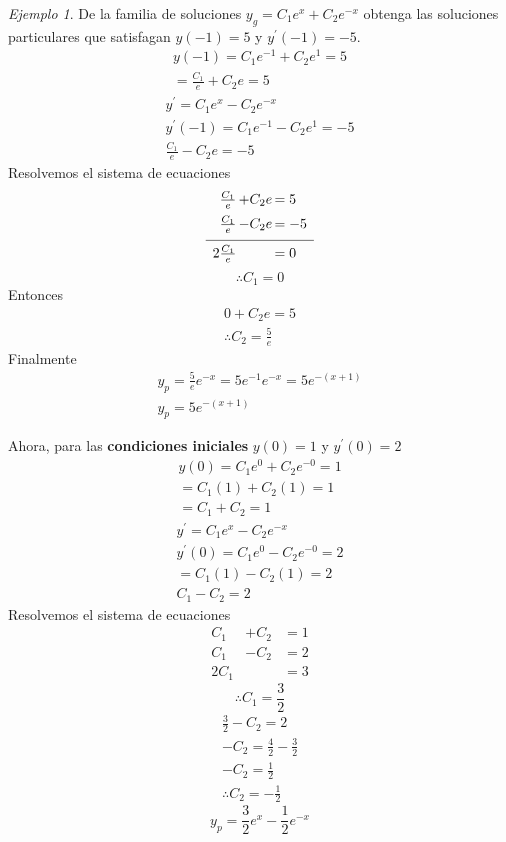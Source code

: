 \documentclass[12pt]{article} %
\theoremstyle{remark} %
\newtheorem{ejemplo}{Ejemplo}[section]
\begin{document}
\begin{ejemplo}
  De la familia de soluciones $y_g = C_1 e^x + C_2 e^{-x}$ obtenga las
  soluciones particulares que satisfagan $y(-1) = 5$ y $y^{\prime}(-1) = -5$.
  \begin{gather*}
    y(-1) = C_1 e^{-1} + C_2 e^1 = 5\\
    = \frac{C_1}{e} + C_2 e = 5
  \end{gather*}
  \begin{gather*}
    y^{\prime} = C_1 e^x - C_2 e^{-x}\\[0.5em]
    y^{\prime}(-1) = C_1 e^{-1} - C_2 e^1 = -5\\[0.5em]
    \frac{C_1}{e} - C_2 e = -5
  \end{gather*}
  Resolvemos el sistema de ecuaciones
\[
\begin{array}{r@{\,}c@{\,}l}
  \frac{C_1}{e} & + C_2 e & = 5 \\[0.5em]
  \frac{C_1}{e} & - C_2 e & = -5 \\[0.5em]
  \hline
  \rule{0pt}{1.2em}2\frac{C_1}{e} &         & = 0
\end{array}
\]
\[ \therefore C_1 = 0 \]
Entonces 
\begin{gather*}
0 + C_2 e = 5\\
\therefore C_2 = \frac{5}{e}
\end{gather*}
Finalmente
\begin{gather*}
  y_p = \frac{5}{e} e^{-x} = 5 e^{-1} e^{-x} = 5e^{-(x+1)}\\
  y_p = 5e^{-(x+1)}
\end{gather*}

Ahora, para las \textbf{condiciones iniciales} $y(0) = 1$ y $y^{\prime}(0) = 2$
\begin{gather*}
  y(0) = C_1 e^0 + C_2 e^{-0} = 1\\[0.5em]
  = C_1(1)+C_2(1) = 1\\[0.5em]
  = C_1 + C_2 = 1
\end{gather*}
\begin{gather*}
  y^{\prime} = C_1 e^x - C_2 e^{-x}\\[0.5em]
  y^{\prime}(0) = C_1 e^0 - C_2e^{-0} = 2\\[0.5em]
  = C_1(1) - C_2(1) = 2\\[0.5em]
  C_1 - C_2 = 2
\end{gather*}
Resolvemos el sistema de ecuaciones
\[
  \begin{array}{rcl}
    C_1 & + C_2 & = 1\\
    C_1 & - C_2 & = 2\\
    \hline
    2C_1 & & = 3
  \end{array}
\]
\[ \therefore C_1 = \frac{3}{2} \]
\begin{gather*}
  \frac{3}{2} - C_2 = 2\\
  -C_2 = \frac{4}{2} - \frac{3}{2}\\
  -C_2 = \frac{1}{2}\\
  \therefore C_2 = - \frac{1}{2}
\end{gather*}
\[ y_p = \frac{3}{2}e^x - \frac{1}{2}e^{-x} \]
\end{ejemplo}
\end{document}
